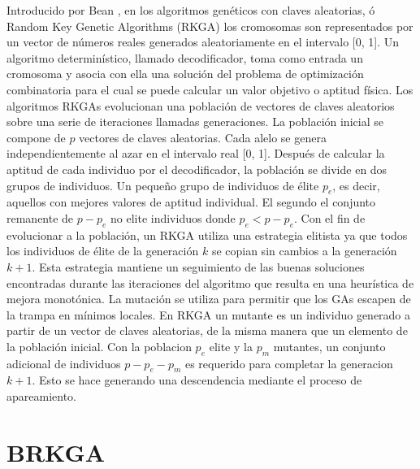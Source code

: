 Introducido por Bean \cite{Bean}, en los algoritmos genéticos con claves aleatorias, ó Random Key Genetic Algorithms (RKGA) los cromosomas son representados por un vector de números reales generados aleatoriamente en el intervalo [0, 1]. Un algoritmo determinístico, llamado decodificador, toma como entrada un cromosoma y asocia con ella una solución del problema de optimización combinatoria para el cual se puede calcular un valor objetivo o aptitud física. Los algoritmos RKGAs evolucionan una población de vectores de claves aleatorios sobre una serie de iteraciones llamadas generaciones. La población inicial se compone de $p$ vectores de claves aleatorias. Cada alelo se genera independientemente al azar en el intervalo real [0, 1]. Después de calcular la aptitud de cada individuo por el decodificador, la población se divide en dos grupos de individuos. Un pequeño grupo de individuos de élite $p_e$, es decir, aquellos con mejores valores de aptitud individual. El segundo el conjunto remanente de $p-p_e$ no elite individuos donde $p_e<p-p_e$. Con el fin de evolucionar a la población, un RKGA utiliza una estrategia elitista ya que todos los individuos de élite de la generación $k$ se copian sin cambios a la generación $k + 1$. Esta estrategia mantiene un seguimiento de las buenas soluciones encontradas durante las iteraciones del algoritmo que resulta en una heurística de mejora monotónica. La mutación se utiliza para permitir que los GAs escapen de la trampa en mínimos locales. En RKGA un mutante es un individuo generado a partir de un vector de claves aleatorias, de la misma manera que un elemento de la población inicial. Con la poblacion $p_e$ elite y la $p_m$ mutantes, un conjunto adicional de individuos $p - p_e - p_m$ es requerido para completar la generacion $k+1$. Esto se hace generando una descendencia mediante el proceso de apareamiento.

\section{BRKGA}\label{sec:brkga}

